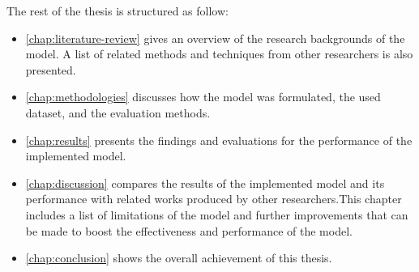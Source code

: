 The rest of the thesis is structured as follow:
\begin{itemize}
    \item \autoref{chap:literature-review} gives an overview of the research backgrounds of the model.
    A list of related methods and techniques from other researchers is also presented.
    \item \autoref{chap:methodologies} discusses how the model was formulated, the used dataset, and the evaluation methods.
    \item \autoref{chap:results} presents the findings and evaluations for the performance of the implemented model.
    \item \autoref{chap:discussion} compares the results of the implemented model and its performance with related works produced by other researchers.This chapter includes a list of limitations of the model and further improvements that can be made to boost the effectiveness and performance of the model.
    \item \autoref{chap:conclusion} shows the overall achievement of this thesis.
\end{itemize}